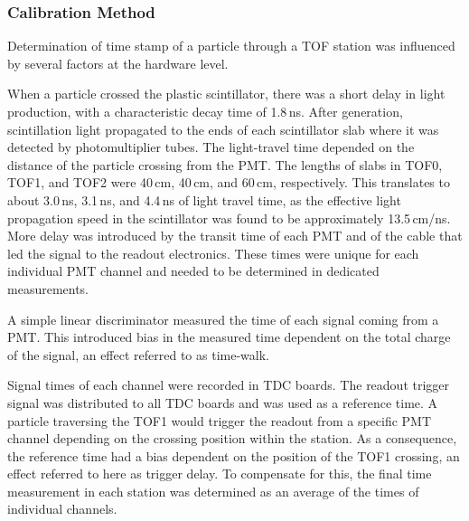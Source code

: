 \subsubsection{Calibration Method}

Determination of time stamp of a particle through a TOF station was
influenced by several factors at the hardware level.

When a particle crossed the plastic scintillator, there was a short delay in light
production, with a characteristic decay time of 1.8\,ns.
After generation, scintillation light propagated to the ends of each
scintillator slab where it was detected by photomultiplier tubes. The
light-travel time depended on the distance of the particle crossing
from the PMT. The lengths of slabs in TOF0, TOF1, and TOF2 were 40\,cm,
40\,cm, and 60\,cm, respectively. This translates to about 3.0\,ns, 3.1\,ns,
and 4.4\,ns of light travel time, as the effective light
propagation speed in the scintillator was found to be approximately
13.5\,cm/ns.  More delay was introduced by the transit time of each PMT
and of the cable that led the signal to the readout electronics. These
times were unique for each individual PMT channel and needed to be
determined in dedicated measurements.

A simple linear discriminator measured the time of each signal coming from a PMT.
This introduced bias in the measured time dependent on the total charge of the signal, an effect referred to as time-walk.

Signal times of each channel were recorded in TDC boards.
The readout trigger signal was distributed to all TDC boards and was used as
a reference time.
A particle traversing the TOF1 would trigger the readout from a specific PMT channel depending on the crossing position within the station.
As a consequence, the reference time had a bias dependent on
the position of the TOF1 crossing, an effect referred to here as trigger
delay. To compensate for this, the final time measurement in each station was determined as an average of the times of individual channels.

